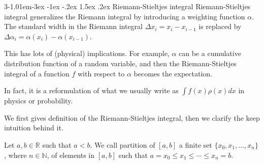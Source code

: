 \documentclass{tufte-handout}
\makeatletter
\renewcommand{\section}{\@startsection{section}%
    {3}{-1.01em}{-3ex \@plus -1ex \@minus -.2ex}%
    {1.5ex \@plus .2ex}
    {\hspace*{-5.5em}\fcolorbox{blue}{blue}{\parbox[c][1.0ex][b]{4em}{\phantom{space}}}
    \normalfont\Large\itshape\color{blue}}}
\makeatother
\begin{document}
\clearpage
\section{Riemann-Stieltjes integral}
Riemann-Stieltjes integral generalizes the Riemann integral by introducing a
weighting function \( \alpha \). The standard width in the Riemann integral 
\(\Delta x_i = x_i - x_{i-1}\) is replaced by \( \Delta \alpha_i = \alpha(x_i) - \alpha(x_{i-1}) \).

This has lots of (physical) implications. For example, \(\alpha\) can be a 
cumulative distribution function of a random variable, and then the Riemann-Stieltjes integral of a function \( f \) with respect to \( \alpha \)
becomes the expectation.

In fact, it is a reformulation of what we usually write as
\( \int f(x) \rho(x) dx \) in physics or probability.

We first gives definition of the Riemann-Stieltjes integral,
then we clarify the keep intuition behind it.
\begin{Definition}[Partition]
    Let \( a, b \in \mathbb{R} \) such that \( a < b \).
    We call partition of \([a,b]\) a finite set 
    \( \{x_0, x_1, \ldots, x_n\} \), where \( n \in \mathbb{N} \), 
    of elements in \([a,b]\) such that \( a = x_0 \leq x_1 \leq \cdots \leq x_n = b \).
\end{Definition}
\end{document}
